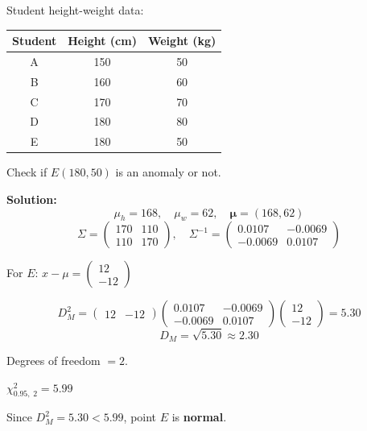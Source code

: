 \documentclass[12pt,a4paper]{article}
\begin{document}
\begin{examplebox}
Student height-weight data:
\begin{center}
\begin{tabular}{ccc}
\toprule
Student & Height (cm) & Weight (kg) \\
\midrule
A & 150 & 50 \\
B & 160 & 60 \\
C & 170 & 70 \\
D & 180 & 80 \\
E & 180 & 50 \\
\bottomrule
\end{tabular}
\end{center}
Check if $E(180, 50)$ is an anomaly or not.

\textbf{Solution:}
\[
\mu_h = 168, \quad \mu_w = 62, \quad \bm{\mu} = (168, 62)
\]
\[
\Sigma = \begin{pmatrix} 170 & 110 \\ 110 & 170 \end{pmatrix}, \quad
\Sigma^{-1} = \begin{pmatrix} 0.0107 & -0.0069 \\ -0.0069 & 0.0107 \end{pmatrix}
\]

For $E$: $x - \mu = \begin{pmatrix} 12 \\ -12 \end{pmatrix}$

\[
D_M^2 = \begin{pmatrix} 12 & -12 \end{pmatrix}
\begin{pmatrix} 0.0107 & -0.0069 \\ -0.0069 & 0.0107 \end{pmatrix}
\begin{pmatrix} 12 \\ -12 \end{pmatrix} = 5.30
\]
\[
D_M = \sqrt{5.30} \approx 2.30
\]

Degrees of freedom $= 2$.

$\chi^2_{0.95,\;2} = 5.99$

Since $D_M^2 = 5.30 < 5.99$, point $E$ is \textbf{normal}.
\end{examplebox}
\end{document}
